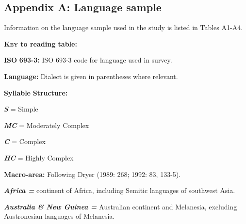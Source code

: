 

\subsection{Appendix A: Language sample}
\begin{styleBody}
Information on the language sample used in the study is listed in Tables A1-A4.
\end{styleBody}

\begin{styleBody}
\textbf{\textsc{Key} \textbf{to} \textbf{reading} \textbf{table:}}
\end{styleBody}

\begin{styleBody}
\textbf{ISO} \textbf{693-3:} ISO 693-3 code for language used in survey.
\end{styleBody}

\begin{styleBody}
\textbf{Language:} Dialect is given in parentheses where relevant.
\end{styleBody}

\begin{styleBody}
\textbf{Syllable} \textbf{Structure:} 
\end{styleBody}

\begin{styleBody}
\textbf{\textit{S} }= Simple 
\end{styleBody}

\begin{styleBody}
\textbf{\textit{MC} }= Moderately Complex
\end{styleBody}

\begin{styleBody}
\textbf{\textit{C} }= Complex
\end{styleBody}

\begin{styleBody}
\textbf{\textit{HC} }= Highly Complex
\end{styleBody}

\begin{styleBody}
\textbf{Macro-area:} Following Dryer (1989: 268; 1992: 83, 133-5). 
\end{styleBody}

\begin{styleBody}
\textbf{\textit{Africa} \textit{=}} continent of Africa, including Semitic languages of southwest Asia. 
\end{styleBody}

\begin{styleBody}
\textbf{\textit{Australia} \textit{\&} \textit{New} \textit{Guinea} \textit{=}} Australian continent and Melanesia, excluding Austronesian languages of Melanesia. 
\end{styleBody}

